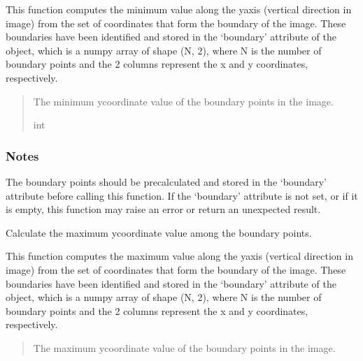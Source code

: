 \documentclass[letterpaper,10pt,english]{sphinxmanual}
\begin{document}
\begin{fulllineitems}
\begin{fulllineitems}
\sphinxAtStartPar
This function computes the minimum value along the y\sphinxhyphen{}axis (vertical direction in image)
from the set of coordinates that form the boundary of the image. These boundaries have been
identified and stored in the ‘boundary’ attribute of the object, which is a numpy array of
shape (N, 2), where N is the number of boundary points and the 2 columns represent the x
and y coordinates, respectively.
\begin{quote}\begin{description}
\sphinxAtStartPar
The minimum y\sphinxhyphen{}coordinate value of the boundary points in the image.

\sphinxAtStartPar
int

\end{description}\end{quote}
\subsubsection*{Notes}

\sphinxAtStartPar
The boundary points should be pre\sphinxhyphen{}calculated and stored in the ‘boundary’ attribute before
calling this function. If the ‘boundary’ attribute is not set, or if it is empty,
this function may raise an error or return an unexpected result.

\end{fulllineitems}


\begin{fulllineitems}
\label{\detokenize{forensicfit.core.tape:forensicfit.core.tape.TapeAnalyzer.ymax}}
\pysigstartsignatures
{}
\pysigstopsignatures
\sphinxAtStartPar
Calculate the maximum y\sphinxhyphen{}coordinate value among the boundary points.

\sphinxAtStartPar
This function computes the maximum value along the y\sphinxhyphen{}axis (vertical direction in image)
from the set of coordinates that form the boundary of the image. These boundaries have been
identified and stored in the ‘boundary’ attribute of the object, which is a numpy array of
shape (N, 2), where N is the number of boundary points and the 2 columns represent the x
and y coordinates, respectively.
\begin{quote}\begin{description}
\sphinxAtStartPar
The maximum y\sphinxhyphen{}coordinate value of the boundary points in the image.


\end{description}
\end{quote}
\end{fulllineitems}
\end{fulllineitems}
\end{document}
